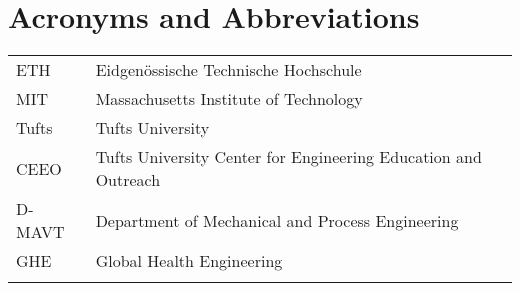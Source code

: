 \section*{Acronyms and Abbreviations}
{\renewcommand{\arraystretch}{1.1} \renewcommand{\tabcolsep}{0.2cm}
\begin{longtable}[h]{@{}p{} @{}p{}@{}}
ETH				& Eidgen\"ossische Technische Hochschule \\
MIT             & Massachusetts Institute of Technology \\
Tufts           & Tufts University \\
CEEO            & Tufts University Center for Engineering Education and Outreach \\
D-MAVT			& Department of Mechanical and Process Engineering \\
GHE 			& Global Health Engineering \\\\


\end{longtable}}
